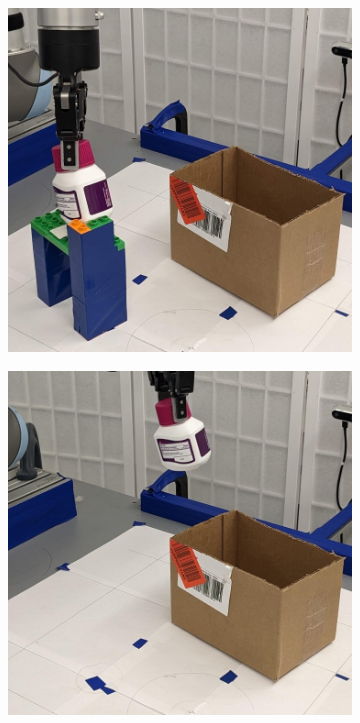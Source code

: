 \documentclass{article}
\begin{document}
\begin{figure}[]
\begin{subfigure}{(\linewidth - 0.05\linewidth)/5}
    \end{subfigure}
    \begin{subfigure}{(\linewidth - 0.05\linewidth)/5}
        \centering
        \includegraphics[width=\linewidth]{figures/episodes/bottle_in_box/8.jpg}
    \end{subfigure}
    \begin{subfigure}{(\linewidth - 0.05\linewidth)/5}
        \centering
        \includegraphics[width=\linewidth]{figures/episodes/bottle_in_box/7.jpg}

\end{subfigure}
\end{figure}
\end{document}
